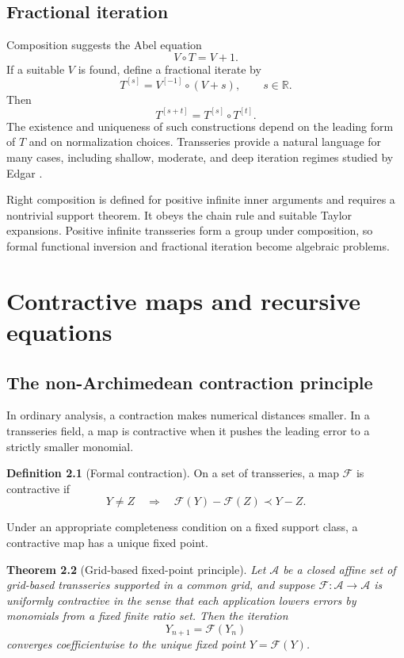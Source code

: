 \documentclass[11pt,oneside]{book}
\newtheorem{theorem}{Theorem}[chapter]
\theoremstyle{definition}
\newtheorem{definition}[theorem]{Definition}
\theoremstyle{remark}
\newcommand{\R}{\mathbb{R}}
\newcommand{\precdom}{\prec}
\newcommand{\compose}{\mathbin{\circ}}
\begin{document}
\section{Fractional iteration}

Composition suggests the Abel equation
\[
  V\compose T=V+1.
\]
If a suitable $V$ is found, define a fractional iterate by
\[
  T^{[s]}=V^{[-1]}\compose(V+s),
  \qquad s\in\R.
\]
Then
\[
  T^{[s+t]}=T^{[s]}\compose T^{[t]}.
\]
The existence and uniqueness of such constructions depend on the leading form
of $T$ and on normalization choices. Transseries provide a natural language for
many cases, including shallow, moderate, and deep iteration regimes studied by
Edgar \cite{EdgarFractional}.

\begin{summarybox}
Right composition is defined for positive infinite inner arguments and requires
a nontrivial support theorem. It obeys the chain rule and suitable Taylor
expansions. Positive infinite transseries form a group under composition, so
formal functional inversion and fractional iteration become algebraic problems.
\end{summarybox}

\chapter{Contractive maps and recursive equations}
\label{ch:fixed-points}

\section{The non-Archimedean contraction principle}

In ordinary analysis, a contraction makes numerical distances smaller. In a
transseries field, a map is contractive when it pushes the leading error to a
strictly smaller monomial.

\begin{definition}[Formal contraction]
On a set of transseries, a map $\mathcal F$ is contractive if
\[
  Y\ne Z
  \quad\Longrightarrow\quad
  \mathcal F(Y)-\mathcal F(Z)\precdom Y-Z.
\]
\end{definition}

Under an appropriate completeness condition on a fixed support class, a
contractive map has a unique fixed point.

\begin{theorem}[Grid-based fixed-point principle]
Let $\mathcal A$ be a closed affine set of grid-based transseries supported in a
common grid, and suppose $\mathcal F:\mathcal A\to\mathcal A$ is uniformly
contractive in the sense that each application lowers errors by monomials from a
fixed finite ratio set. Then the iteration
\[
  Y_{n+1}=\mathcal F(Y_n)
\]
converges coefficientwise to the unique fixed point $Y=\mathcal F(Y)$.
\end{theorem}
\end{document}
